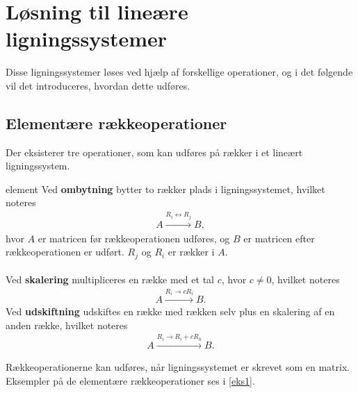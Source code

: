\section{Løsning til lineære ligningssystemer}
%
Disse ligningssystemer løses ved hjælp af forskellige operationer, og i det følgende vil det introduceres, hvordan dette udføres.
%
\subsection{Elementære rækkeoperationer}
Der eksisterer tre operationer, som kan udføres på rækker i et lineært ligningssystem.
%
\begin{defn}{}{element}
Ved \textbf{ombytning} bytter to rækker plads i ligningssystemet, hvilket noteres
\begin{align*}
A \xrightarrow{R_i \leftrightarrow R_j} B, 
\end{align*}
hvor $A$ er matricen før rækkeoperationen udføres, og $B$ er matricen efter rækkeoperationen er udført. 
$R_j$ og $R_i$ er rækker i $A$.\\\\
Ved \textbf{skalering} multipliceres en række med et tal $c$, hvor $c \neq 0$, hvilket noteres
\begin{align*}
A \xrightarrow{R_i \rightarrow cR_i} B.
\end{align*}
Ved \textbf{udskiftning} udskiftes en række med rækken selv plus en skalering af en anden række, hvilket noteres
\begin{align*}
A \xrightarrow{R_i \rightarrow R_i + cR_h} B.
\end{align*}
%
\end{defn}
\noindent
Rækkeoperationerne kan udføres, når ligningssystemet er skrevet som en matrix. Eksempler på de elementære rækkeoperationer ses i \ref{eks1}.
\\
%
%
